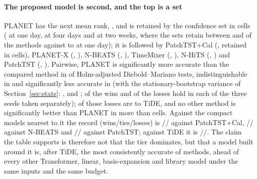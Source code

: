 \paragraph{The proposed model is second, and the top is a set} PLANET has the next mean rank,
, and is retained by the confidence set in  cells
( at one day,  at four days and
 at two weeks, where the sets retain between
 and  of the  methods
against  to  at one day); it is followed
by PatchTST+Cal
(, retained in  cells), PLANET-X
(, ), N-BEATS
(, ), TimeMixer
(, ), N-HiTS
(, ) and PatchTST
(, ). Pairwise, PLANET is
significantly more accurate than the compared method in  of
 Holm-adjusted Diebold--Mariano tests, indistinguishable in 
and significantly less accurate in  (with the stationary-bootstrap
variance of Section~\ref{sec:stats}: ,  and
;  of the wins and
 of the losses hold in each of the three seeds taken separately);
 of those losses
are to TiDE, and no other method is significantly better than PLANET in more than
 cells. Against the compact models nearest to it the record
(wins/ties/losses) is // against
PatchTST+Cal, // against N-BEATS
and // against PatchTST;
against TiDE it is //. The claim the table
supports is therefore not that the tier dominates, but that a model built around it is, after
TiDE, the most consistently accurate of  methods, ahead of every other
Transformer, linear, basis-expansion and library model under the same inputs and the same
budget.

